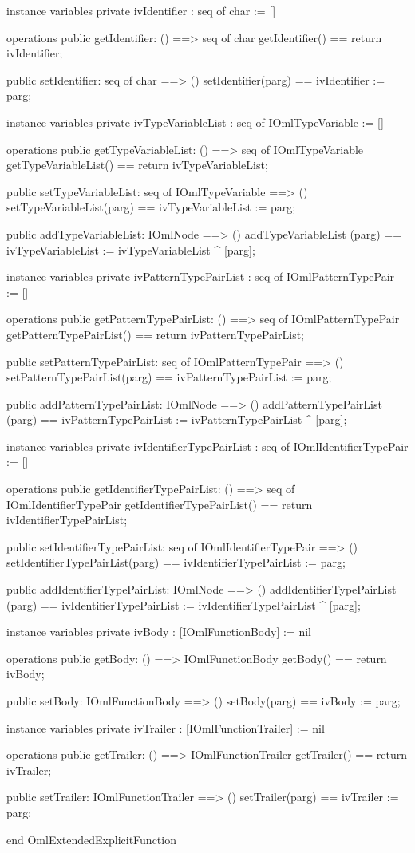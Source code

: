 \begin{vdm_al}
instance variables
  private ivIdentifier : seq of char := []

operations
  public getIdentifier: () ==> seq of char
  getIdentifier() == return ivIdentifier;

  public setIdentifier: seq of char ==> ()
  setIdentifier(parg) == ivIdentifier := parg;

instance variables
  private ivTypeVariableList : seq of IOmlTypeVariable := []

operations
  public getTypeVariableList: () ==> seq of IOmlTypeVariable
  getTypeVariableList() == return ivTypeVariableList;

  public setTypeVariableList: seq of IOmlTypeVariable ==> ()
  setTypeVariableList(parg) == ivTypeVariableList := parg;

  public addTypeVariableList: IOmlNode ==> ()
  addTypeVariableList (parg) == ivTypeVariableList := ivTypeVariableList ^ [parg];

instance variables
  private ivPatternTypePairList : seq of IOmlPatternTypePair := []

operations
  public getPatternTypePairList: () ==> seq of IOmlPatternTypePair
  getPatternTypePairList() == return ivPatternTypePairList;

  public setPatternTypePairList: seq of IOmlPatternTypePair ==> ()
  setPatternTypePairList(parg) == ivPatternTypePairList := parg;

  public addPatternTypePairList: IOmlNode ==> ()
  addPatternTypePairList (parg) == ivPatternTypePairList := ivPatternTypePairList ^ [parg];

instance variables
  private ivIdentifierTypePairList : seq of IOmlIdentifierTypePair := []

operations
  public getIdentifierTypePairList: () ==> seq of IOmlIdentifierTypePair
  getIdentifierTypePairList() == return ivIdentifierTypePairList;

  public setIdentifierTypePairList: seq of IOmlIdentifierTypePair ==> ()
  setIdentifierTypePairList(parg) == ivIdentifierTypePairList := parg;

  public addIdentifierTypePairList: IOmlNode ==> ()
  addIdentifierTypePairList (parg) == ivIdentifierTypePairList := ivIdentifierTypePairList ^ [parg];

instance variables
  private ivBody : [IOmlFunctionBody] := nil

operations
  public getBody: () ==> IOmlFunctionBody
  getBody() == return ivBody;

  public setBody: IOmlFunctionBody ==> ()
  setBody(parg) == ivBody := parg;

instance variables
  private ivTrailer : [IOmlFunctionTrailer] := nil

operations
  public getTrailer: () ==> IOmlFunctionTrailer
  getTrailer() == return ivTrailer;

  public setTrailer: IOmlFunctionTrailer ==> ()
  setTrailer(parg) == ivTrailer := parg;

end OmlExtendedExplicitFunction
\end{vdm_al}

